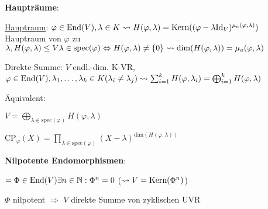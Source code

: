\textbf{Haupträume}:
\begin{items}
  \item \underline{Hauptraum}: $\varphi \in \text{End}(V), \lambda \in K \leadsto H(\varphi, \lambda) \\* = \text{Kern}((\varphi - \lambda \text{Id}_V)^{\mu_a(\varphi, \lambda)})$ Hauptraum von $\varphi$ zu $\lambda, H(\varphi, \lambda) \leq V \\* \lambda \in \text{spec}(\varphi) \Leftrightarrow H(\varphi, \lambda) \neq \{ 0 \} \\* \leadsto \text{dim}(H(\varphi, \lambda)) = \mu_a(\varphi, \lambda)$
  \item Direkte Summe: $V$ endl.-dim. K-VR, $\varphi \in \text{End}(V), \lambda_1,\dots,\lambda_k \in K (\lambda_i \neq \lambda_j) \\* \leadsto \sum_{i=1}^k H(\varphi, \lambda_i) = \bigoplus_{i=1}^k H(\varphi, \lambda)$
  \item Äquivalent:
  \begin{enumeration}
    \item $V = \bigoplus_{\lambda \in \text{spec}(\varphi)} H(\varphi, \lambda)$
    \item $\text{CP}_\varphi(X)=\prod_{\lambda \in \text{spec}(\varphi)} (X - \lambda)^{\text{dim}(H(\varphi, \lambda))}$
  \end{enumeration}
\end{items}

\textbf{Nilpotente Endomorphismen}:
\begin{items}
  \item \( = \Phi \in \text{End}(V) \exists n \in \mathbb{N}: \Phi^n = 0 \) (\( \leadsto V = \text{Kern}(\Phi^n) \))
  \item \( \Phi \) nilpotent \( \Rightarrow \) \( V \) direkte Summe von zyklischen UVR
\end{items}

